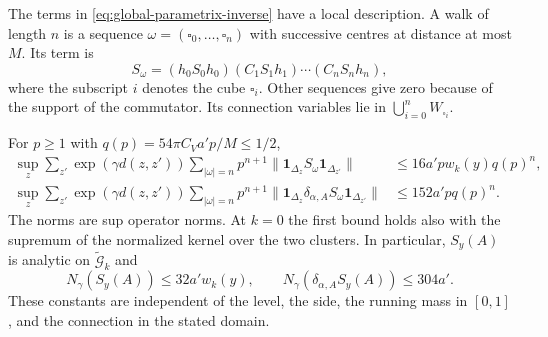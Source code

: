 The terms in \eqref{eq:global-parametrix-inverse} have a local
description. A walk of length $n$ is a sequence
$\omega=(\square_0,\ldots,\square_n)$ with successive centres at
distance at most $M$. Its term is
\[
 S_\omega=(h_0S_0h_0)(C_1S_1h_1)\cdots(C_nS_nh_n),
\]
where the subscript $i$ denotes the cube $\square_i$.
Other sequences give zero because of the support of the commutator.
Its connection variables lie in
$\bigcup_{i=0}^nW_{\square_i}$.

\begin{proposition}\label{prop:walk-propagator-bounds}
For $p\ge1$ with $q(p)=54\pi C_Va'p/M\le1/2$,
\begin{align}
 \sup_z\sum_{z'}\exp(\gamma d(z,z'))
       \sum_{|\omega|=n}p^{n+1}
           \|\mathbf1_{\Delta_z}S_\omega\mathbf1_{\Delta_{z'}}\|
       &\le16a'pw_k(y)q(p)^n,\label{eq:walk-row-bound}\\
 \sup_z\sum_{z'}\exp(\gamma d(z,z'))
       \sum_{|\omega|=n}p^{n+1}
           \|\mathbf1_{\Delta_z}\delta_{\alpha,A}S_\omega
                            \mathbf1_{\Delta_{z'}}\|
       &\le152a'pq(p)^n.\label{eq:walk-holder-bound}
\end{align}
The norms are sup operator norms. At $k=0$ the first bound holds
also with the supremum of the normalized kernel over the two clusters.
In particular, $S_y(A)$ is analytic on $\widetilde{\mathcal G}_k$ and
\begin{equation}\label{eq:global-propagator-bounds}
 N_\gamma(S_y(A))\le32a'w_k(y),\qquad
 N_\gamma(\delta_{\alpha,A}S_y(A))\le304a'.
\end{equation}
These constants are independent of the level, the side, the running
mass in $[0,1]$, and the connection in the stated domain.
\end{proposition}

